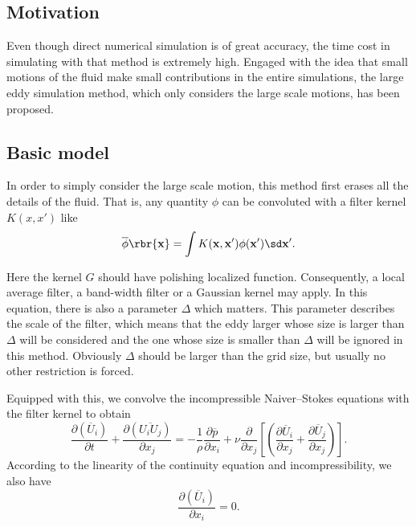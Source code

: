 \documentclass[english, nochinese]{pkupaper}
\begin{document}
\subsection{Motivation}

Even though direct numerical simulation is of great accuracy, the time cost in simulating with that method is extremely high. Engaged with the idea that small motions of the fluid make small contributions in the entire simulations, the large eddy simulation method, which only considers the large scale motions, has been proposed.

\subsection{Basic model}

In order to simply consider the large scale motion, this method first erases all the details of the fluid. That is, any quantity $\phi$ can be convoluted with a filter kernel $K(x, x')$ like %
\begin{equation}\label{Eq:Conv}
\overline{\phi} \rbr{\mathbf{x}} = \int K(\mathbf{x}, \mathbf{x}') \phi(\mathbf{x}')\sd \mathbf{x}'.
\end{equation}

Here the kernel $G$ should have polishing localized function. Consequently, a local average filter, a band-width filter or a Gaussian kernel may apply. In this equation, there is also a parameter $\Delta$ which matters. This parameter describes the scale of the filter, which means that the eddy larger whose size is larger than $\Delta$ will be considered and the one whose size is smaller than $\Delta$ will be ignored in this method. Obviously $\Delta$ should be larger than the grid size, but usually no other restriction is forced.

Equipped with this, we convolve the incompressible Naiver--Stokes equations with the filter kernel to obtain%
\begin{equation}\label{Eq:ConvKe}
\frac{\partial(\overline{U}_i)}{\partial t} + \frac{\partial(\overline{U_iU_j})}{\partial x_j} = -\frac{1}{\rho} \frac{\partial\overline{p}}{\partial x_i} +\nu \frac{\partial}{\partial x_j}\left[\left(\frac{\partial\overline{U}_i}{\partial x_j}+\frac{\partial\overline{U}_j}{\partial x_j}\right)\right].
\end{equation}
According to the linearity of the continuity equation and incompressibility, we also have
\begin{equation}
\frac{\partial(\overline{U}_i)}{\partial x_i} = 0.
\end{equation}
\end{document}
